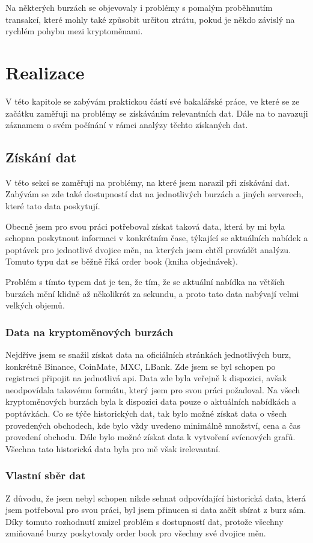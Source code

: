 \documentclass[thesis=B,czech]{FITthesis}[2019/03/21]
\begin{document}
Na některých burzách se objevovaly i problémy s pomalým proběhnutím transakcí, které mohly také způsobit určitou ztrátu, pokud je někdo závislý na rychlém pohybu mezi kryptoměnami. \cite{finder}

\chapter{Realizace}
V této kapitole se zabývám praktickou částí své bakalářské práce, ve které se ze začátku zaměřuji na problémy se získáváním relevantních dat. Dále na to navazuji záznamem o svém počínání v rámci analýzy těchto získaných dat. 

\section{Získání dat}
V této sekci se zaměřuji na problémy, na které jsem narazil při získávání dat. Zabývám se zde také dostupností dat na jednotlivých burzách a jiných serverech, které tato data poskytují. 

Obecně jsem pro svou práci potřeboval získat taková data, která by mi byla schopna poskytnout informaci v konkrétním čase, týkající se aktuálních nabídek a poptávek pro jednotlivé dvojice měn, na kterých jsem chtěl provádět analýzu. Tomuto typu dat se běžně říká order book (kniha objednávek).

Problém s tímto typem dat je ten, že tím, že se aktuální nabídka na větších burzách mění klidně až několikrát za sekundu, a proto tato data nabývají velmi velkých objemů.

\subsection{Data na kryptoměnových burzách}
Nejdříve jsem se snažil získat data na oficiálních stránkách jednotlivých burz, konkrétně Binance, CoinMate, MXC, LBank. Zde jsem se byl schopen po registraci připojit na jednotlivá api. Data zde byla veřejně k dispozici, avšak neodpovídala takovému formátu, který jsem pro svou práci požadoval. 
Na všech kryptoměnových burzách byla k dispozici data pouze o aktuálních nabídkách a poptávkách. Co se týče historických dat, tak bylo možné získat data o všech provedených obchodech, kde bylo vždy uvedeno minimálně množství, cena a čas provedení obchodu. Dále bylo možné získat data k vytvoření svícnových grafů. Všechna tato historická data byla pro mě však irelevantní.

\subsection{Vlastní sběr dat}
Z důvodu, že jsem nebyl schopen nikde sehnat odpovídající historická data, která jsem potřeboval pro svou práci, byl jsem přinucen si data začít sbírat z burz sám. Díky tomuto rozhodnutí zmizel problém s dostupností dat, protože všechny zmiňované burzy poskytovaly order book pro všechny své dvojice měn.
\end{document}
